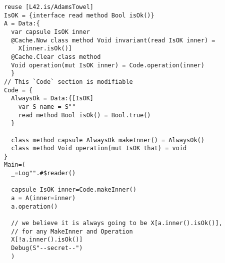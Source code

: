 \begin{lstlisting}[caption=Bug Bounty Challenge \#3]
reuse [L42.is/AdamsTowel]
IsOK = {interface read method Bool isOk()}
A = Data:{
  var capsule IsOK inner
  @Cache.Now class method Void invariant(read IsOK inner) =
    X[inner.isOk()]
  @Cache.Clear class method
  Void operation(mut IsOK inner) = Code.operation(inner)
  }
// This `Code` section is modifiable
Code = {
  AlwaysOk = Data:{[IsOK]
    var S name = S""
    read method Bool isOk() = Bool.true()
  }

  class method capsule AlwaysOk makeInner() = AlwaysOk()
  class method Void operation(mut IsOK that) = void
}
Main=(
  _=Log"".#$reader()

  capsule IsOK inner=Code.makeInner()
  a = A(inner=inner)
  a.operation()

  // we believe it is always going to be X[a.inner().isOk()],
  // for any MakeInner and Operation
  X[!a.inner().isOk()]
  Debug(S"--secret--")
  )
\end{lstlisting}
